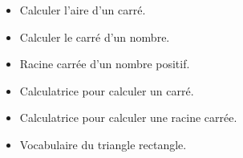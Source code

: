 \begin{prerequis}[Prérequis]    
    \begin{itemize}                
        \item Calculer l'aire d'un carré.
        \item Calculer le carré d'un nombre.
        \item Racine carrée d'un nombre positif.
        \item Calculatrice pour calculer un carré.
        \item Calculatrice pour calculer une racine carrée.
        \item Vocabulaire du triangle rectangle.
    \end{itemize}
\end{prerequis}
